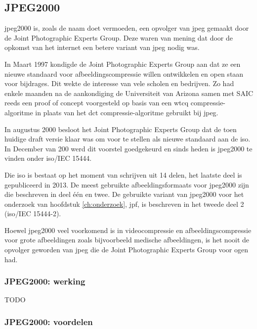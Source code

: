 \subsection{JPEG2000}
\label{sec:afbeeldingscompressie-jpeg2000}

\Gls{jpeg2000} is, zoals de naam doet vermoeden, een opvolger van \gls{jpeg} gemaakt door de Joint Photographic Experts Group. Deze waren van mening dat door de opkomst van het internet een betere variant van \gls{jpeg} nodig was.

In Maart 1997 kondigde de Joint Photographic Experts Group aan dat ze een nieuwe standaard voor afbeeldingscompressie willen ontwikkelen en open staan voor bijdrages. Dit wekte de interesse van vele scholen en bedrijven. Zo had enkele maanden na de aankondiging de Universiteit van Arizona samen met SAIC reeds een proof of concept voorgesteld op basis van een \gls{wtcq} \gls{compressie-algoritme} in plaats van het \gls{dct} \gls{compressie-algoritme} gebruikt bij \gls{jpeg}.

In augustus 2000 besloot het Joint Photographic Experts Group dat de toen huidige draft versie klaar was om voor te stellen als nieuwe standaard aan de \gls{iso}. In December van 200 werd dit voorstel goedgekeurd en sinds heden is  \gls{jpeg2000} te vinden onder \gls{iso}/IEC 15444. 

Die \gls{iso} is bestaat op het moment van schrijven uit 14 delen, het laatste deel is gepubliceerd in 2013. De meest gebruikte \glspl{afbeeldingsformaat} voor \gls{jpeg2000} zijn die beschreven in deel één en twee. De gebruikte variant van \gls{jpeg2000} voor het onderzoek van hoofdstuk \ref{ch:onderzoek}, \gls{jpf}, is beschreven in het tweede deel 2 (\gls{iso}/IEC 15444-2).

Hoewel \gls{jpeg2000} veel voorkomend is in \gls{videocompressie} en \gls{afbeeldingscompressie} voor grote afbeeldingen zoals bijvoorbeeld medische afbeeldingen, is het nooit de opvolger geworden van \gls{jpeg} die de Joint Photographic Experts Group voor ogen had.


\subsubsection{JPEG2000: werking}
\label{sec:afbeeldingscompressie-jpeg2000-werking}

TODO


\subsubsection{JPEG2000: voordelen}
\label{sec:afbeeldingscompressie-jpeg2000-voordelen}

